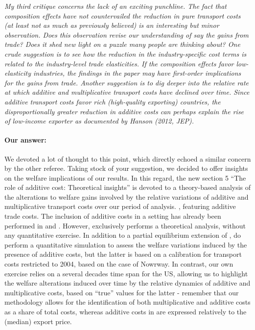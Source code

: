 \documentclass[a4paper,12pt]{article}
\begin{document}
\textit{My third critique concerns the lack of an exciting punchline. The fact that
composition effects have not countervailed the reduction in pure transport costs
(at least not as much as previously believed) is an interesting but minor observation.
Does this observation revise our understanding of say the gains from
trade? Does it shed new light on a puzzle many people are thinking about?
One crude suggestion is to see how the reduction in the industry-specific cost
terms is related to the industry-level trade elasticities. If the composition effects
favor low-elasticity industries, the findings in the paper may have first-order
implications for the gains from trade.
Another suggestion is to dig deeper into the relative rate at which additive
and multiplicative transport costs have declined over time. Since additive transport
costs favor rich (high-quality exporting) countries, the disproportionally
greater reduction in additive costs can perhaps explain the rise of low-income
exporter as documented by Hanson (2012, JEP).}

\paragraph{Our answer:}
\noindent We devoted a lot of thought to this point, which directly echoed a similar concern by the other referee. Taking stock of your suggestion, we decided to offer insights on the welfare implications of our results. In this regard,%
the new section 5 ``The role of additive cost: Theoretical insights'' is devoted to a theory-based analysis of the alterations to welfare gains involved by the relative variations of additive and multiplicative transport costs over our period of analysis. \citet{melitz}, featuring additive trade costs. The inclusion of additive costs in a \citet{melitz} setting has already been performed in \citet{sorensen2014} and \citet{Irrazabal_2015}. However, \citet{sorensen2014} exclusively performs a theoretical analysis, without any quantitative exercise. In addition to a partial equilibrium extension of \citet{melitz}, \citet{Irrazabal_2015} do perform a quantitative simulation to assess the welfare variations induced by the presence of additive costs, but the latter is based on a calibration for transport costs restricted to 2004, based on the case of Nowrway. In contrast, our own exercise relies on a several decades time span for the US, allowing us to highlight the welfare alterations induced over time by the relative dynamics of additive and multiplicative costs, based on ``true'' values for the latter - remember that our methodology allows for the identification of both multiplicative and additive costs as a share of total costs, whereas additive costs in \citet{Irrazabal_2015} are expressed relatively to the (median) export price.
\end{document}
